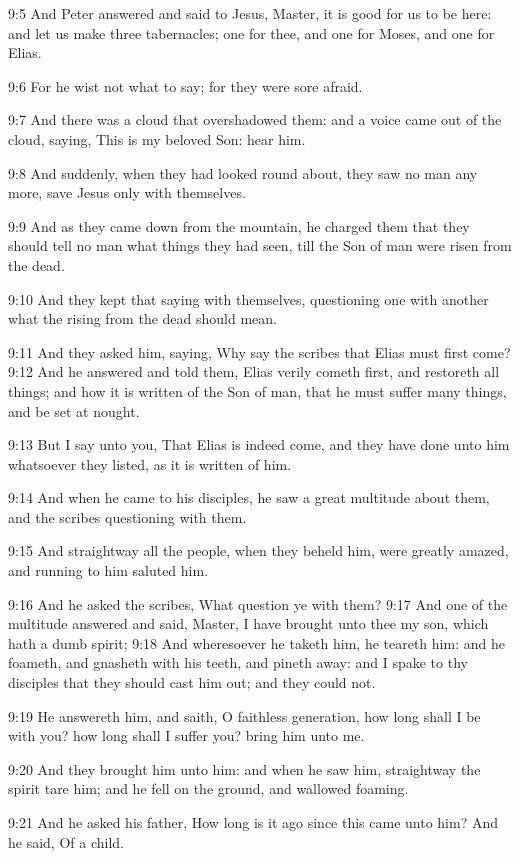 9:5 And Peter answered and said to Jesus, Master, it is good for us to be here: and let us make three tabernacles; one for thee, and one for Moses, and one for Elias.

9:6 For he wist not what to say; for they were sore afraid.

9:7 And there was a cloud that overshadowed them: and a voice came out of the cloud, saying, This is my beloved Son: hear him.

9:8 And suddenly, when they had looked round about, they saw no man any more, save Jesus only with themselves.

9:9 And as they came down from the mountain, he charged them that they should tell no man what things they had seen, till the Son of man were risen from the dead.

9:10 And they kept that saying with themselves, questioning one with another what the rising from the dead should mean.

9:11 And they asked him, saying, Why say the scribes that Elias must first come?  9:12 And he answered and told them, Elias verily cometh first, and restoreth all things; and how it is written of the Son of man, that he must suffer many things, and be set at nought.

9:13 But I say unto you, That Elias is indeed come, and they have done unto him whatsoever they listed, as it is written of him.

9:14 And when he came to his disciples, he saw a great multitude about them, and the scribes questioning with them.

9:15 And straightway all the people, when they beheld him, were greatly amazed, and running to him saluted him.

9:16 And he asked the scribes, What question ye with them?  9:17 And one of the multitude answered and said, Master, I have brought unto thee my son, which hath a dumb spirit; 9:18 And wheresoever he taketh him, he teareth him: and he foameth, and gnasheth with his teeth, and pineth away: and I spake to thy disciples that they should cast him out; and they could not.

9:19 He answereth him, and saith, O faithless generation, how long shall I be with you? how long shall I suffer you? bring him unto me.

9:20 And they brought him unto him: and when he saw him, straightway the spirit tare him; and he fell on the ground, and wallowed foaming.

9:21 And he asked his father, How long is it ago since this came unto him?  And he said, Of a child.

